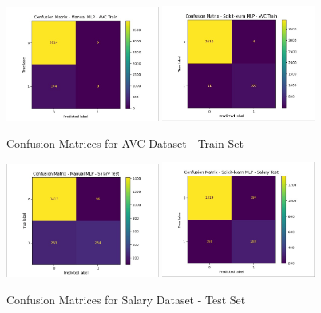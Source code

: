 \documentclass[a4paper,12pt]{article}
\begin{document}
\begin{figure}[H]
    \centering
    \includegraphics[width=0.45\textwidth]{Resources/mlp_manual_confusion_avc_train.jpeg}
    \includegraphics[width=0.45\textwidth]{Resources/mlp_scikit_confusion_avc_train.jpeg}
    \caption{Confusion Matrices for AVC Dataset - Train Set}
    \label{fig:mlp_confusion_avc_train}
\end{figure}

\begin{figure}[H]
    \centering
    \includegraphics[width=0.45\textwidth]{Resources/mlp_manual_confusion_salary_test.jpeg}
    \includegraphics[width=0.45\textwidth]{Resources/mlp_scikit_confusion_salary_test.jpeg}
    \caption{Confusion Matrices for Salary Dataset - Test Set}
    \label{fig:mlp_confusion_salary_test}
\end{figure}
\end{document}
